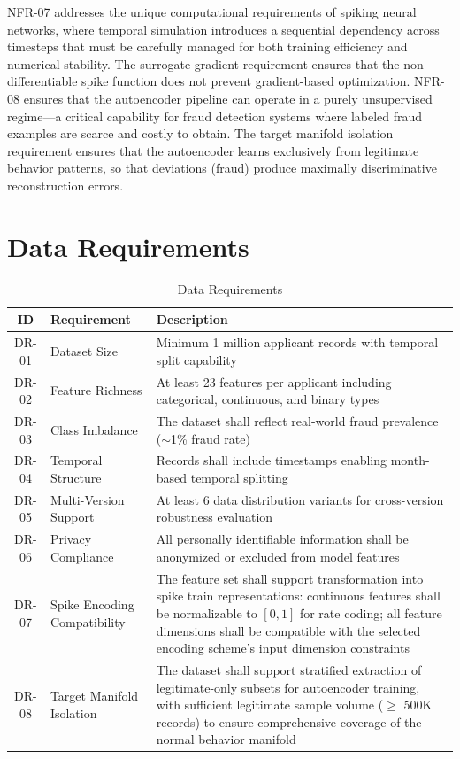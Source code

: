 NFR-07 addresses the unique computational requirements of spiking neural networks, where temporal simulation introduces a sequential dependency across timesteps that must be carefully managed for both training efficiency and numerical stability. The surrogate gradient requirement ensures that the non-differentiable spike function does not prevent gradient-based optimization. NFR-08 ensures that the autoencoder pipeline can operate in a purely unsupervised regime---a critical capability for fraud detection systems where labeled fraud examples are scarce and costly to obtain. The target manifold isolation requirement ensures that the autoencoder learns exclusively from legitimate behavior patterns, so that deviations (fraud) produce maximally discriminative reconstruction errors.

\section{Data Requirements}

\begin{table}[H]
\centering
\caption{Data Requirements}
\label{tab:data-reqs}
\small
\begin{tabularx}{\textwidth}{clL}
\toprule
\textbf{ID} & \textbf{Requirement} & \textbf{Description} \\
\midrule
DR-01 & Dataset Size & Minimum 1 million applicant records with temporal split capability \\
DR-02 & Feature Richness & At least 23 features per applicant including categorical, continuous, and binary types \\
DR-03 & Class Imbalance & The dataset shall reflect real-world fraud prevalence ($\sim$1\% fraud rate) \\
DR-04 & Temporal Structure & Records shall include timestamps enabling month-based temporal splitting \\
DR-05 & Multi-Version Support & At least 6 data distribution variants for cross-version robustness evaluation \\
DR-06 & Privacy Compliance & All personally identifiable information shall be anonymized or excluded from model features \\
DR-07 & Spike Encoding Compatibility & The feature set shall support transformation into spike train representations: continuous features shall be normalizable to $[0,1]$ for rate coding; all feature dimensions shall be compatible with the selected encoding scheme's input dimension constraints \\
DR-08 & Target Manifold Isolation & The dataset shall support stratified extraction of legitimate-only subsets for autoencoder training, with sufficient legitimate sample volume ($\geq$ 500K records) to ensure comprehensive coverage of the normal behavior manifold \\
\bottomrule
\end{tabularx}
\end{table}

